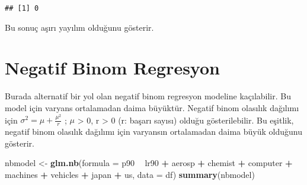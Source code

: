 \documentclass[
]{book}
\newenvironment{Shaded}{\begin{snugshade}}{\end{snugshade}}
\newcommand{\DataTypeTok}[1]{\textcolor[rgb]{0.13,0.29,0.53}{#1}}
\newcommand{\KeywordTok}[1]{\textcolor[rgb]{0.13,0.29,0.53}{\textbf{#1}}}
\newcommand{\NormalTok}[1]{#1}
\newcommand{\OperatorTok}[1]{\textcolor[rgb]{0.81,0.36,0.00}{\textbf{#1}}}
\newcommand{\OtherTok}[1]{\textcolor[rgb]{0.56,0.35,0.01}{#1}}
\newcommand{\StringTok}[1]{\textcolor[rgb]{0.31,0.60,0.02}{#1}}
\begin{document}
\begin{Shaded}
\end{Shaded}

\begin{verbatim}
## [1] 0
\end{verbatim}

Bu sonuç aşırı yayılım olduğunu gösterir.

\hypertarget{negatif-binom-regresyon}{%
\section{Negatif Binom Regresyon}\label{negatif-binom-regresyon}}

Burada alternatif bir yol olan negatif binom regresyon modeline kaçılabilir. Bu model için varyans ortalamadan daima büyüktür. Negatif binom olasılık dağılımı için \(\sigma^2 = \mu + \frac{\mu^2}{r}\) ; \(\mu\) \textgreater{} 0, r \textgreater{} 0 (r: başarı sayısı) olduğu gösterilebilir. Bu eşitlik, negatif binom olasılık dağılımı için varyansın ortalamadan daima büyük olduğunu gösterir.

\begin{Shaded}
\begin{Highlighting}[]
\NormalTok{nbmodel <-}\StringTok{ }\KeywordTok{glm.nb}\NormalTok{(}\DataTypeTok{formula =}\NormalTok{ p90 }\OperatorTok{~}\StringTok{ }\NormalTok{lr90 }\OperatorTok{+}\StringTok{ }\NormalTok{aerosp }\OperatorTok{+}\StringTok{ }\NormalTok{chemist }\OperatorTok{+}\StringTok{ }\NormalTok{computer }\OperatorTok{+}\StringTok{ }\NormalTok{machines }\OperatorTok{+}\StringTok{ }\NormalTok{vehicles }\OperatorTok{+}\StringTok{ }\NormalTok{japan }\OperatorTok{+}\StringTok{ }\NormalTok{us, }\DataTypeTok{data =}\NormalTok{ df)}
\KeywordTok{summary}\NormalTok{(nbmodel)}
\end{Highlighting}
\end{Shaded}
\end{document}
